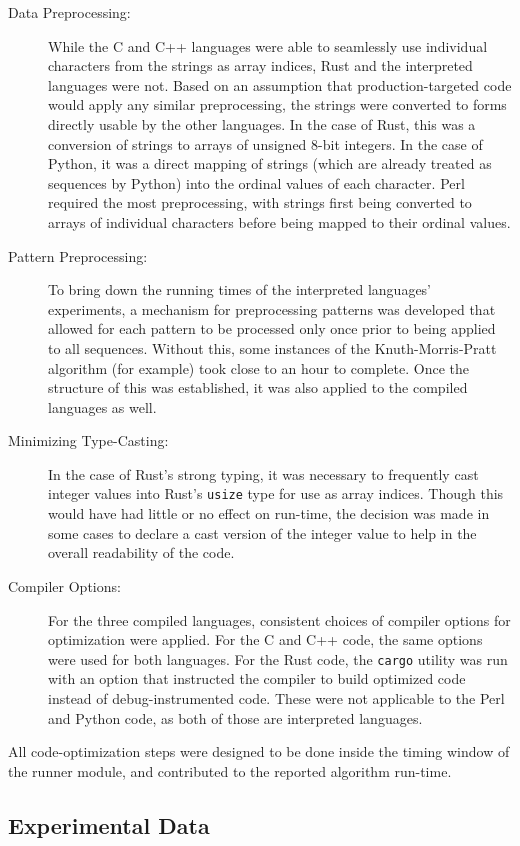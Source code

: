 \begin{description}
\item[Data Preprocessing:] While the C and C++ languages were able to seamlessly use individual characters from the strings as array indices, Rust and the interpreted languages were not. Based on an assumption that production-targeted code would apply any similar preprocessing, the strings were converted to forms directly usable by the other languages. In the case of Rust, this was a conversion of strings to arrays of unsigned 8-bit integers. In the case of Python, it was a direct mapping of strings (which are already treated as sequences by Python) into the ordinal values of each character. Perl required the most preprocessing, with strings first being converted to arrays of individual characters before being mapped to their ordinal values.
\item[Pattern Preprocessing:] To bring down the running times of the interpreted languages' experiments, a mechanism for preprocessing patterns was developed that allowed for each pattern to be processed only once prior to being applied to all sequences. Without this, some instances of the Knuth-Morris-Pratt algorithm (for example) took close to an hour to complete. Once the structure of this was established, it was also applied to the compiled languages as well.
\item[Minimizing Type-Casting:] In the case of Rust's strong typing, it was necessary to frequently cast integer values into Rust's \texttt{usize} type for use as array indices. Though this would have had little or no effect on run-time, the decision was made in some cases to declare a cast version of the integer value to help in the overall readability of the code.
\item[Compiler Options:] For the three compiled languages, consistent choices of compiler options for optimization were applied. For the C and C++ code, the same options were used for both languages. For the Rust code, the \texttt{cargo} utility was run with an option that instructed the compiler to build optimized code instead of debug-instrumented code. These were not applicable to the Perl and Python code, as both of those are interpreted languages.
\end{description}

All code-optimization steps were designed to be done inside the timing window of the runner module, and contributed to the reported algorithm run-time.

\subsection{Experimental Data}
\label{subsec:data}


